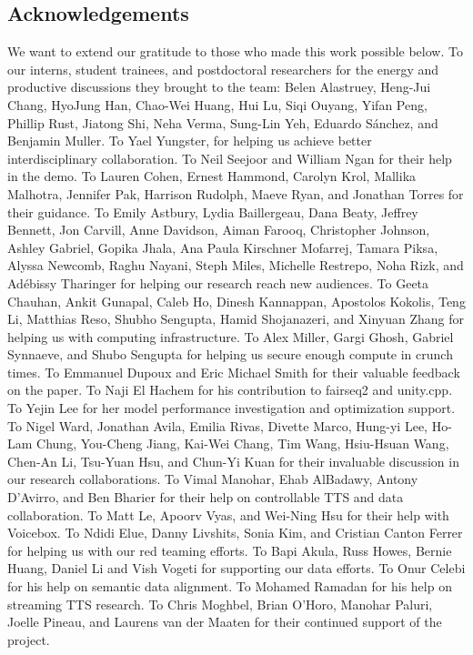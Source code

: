 \subsection*{Acknowledgements}
We want to extend our gratitude to those who made this work possible below. To our interns, student trainees, and postdoctoral researchers for the energy and productive discussions they brought to the team: Belen Alastruey, Heng-Jui Chang, HyoJung Han, Chao-Wei Huang, Hui Lu, Siqi Ouyang, Yifan Peng, Phillip Rust, Jiatong Shi, Neha Verma, Sung-Lin Yeh, Eduardo Sánchez, and Benjamin Muller. To Yael Yungster, for helping us achieve better interdisciplinary collaboration. To Neil Seejoor and William Ngan for their help in the demo. To Lauren Cohen, Ernest Hammond, Carolyn Krol, Mallika Malhotra, Jennifer Pak, Harrison Rudolph, Maeve Ryan, and Jonathan Torres for their guidance. To Emily Astbury, Lydia Baillergeau, Dana Beaty, Jeffrey Bennett, Jon Carvill, Anne Davidson, Aiman Farooq, Christopher Johnson, Ashley Gabriel, Gopika Jhala, Ana Paula Kirschner Mofarrej, Tamara Piksa, Alyssa Newcomb, Raghu Nayani, Steph Miles, Michelle Restrepo, Noha Rizk, and Adébissy Tharinger for helping our research reach new audiences. To Geeta Chauhan, Ankit Gunapal, Caleb Ho, Dinesh Kannappan, Apostolos Kokolis, Teng Li, Matthias Reso, Shubho Sengupta, Hamid Shojanazeri, and Xinyuan Zhang for helping us with computing infrastructure. To Alex Miller, Gargi Ghosh, Gabriel Synnaeve, and Shubo Sengupta for helping us secure enough compute in crunch times. To Emmanuel Dupoux and Eric Michael Smith for their valuable feedback on the paper. To Naji El Hachem for his contribution to fairseq2 and unity.cpp. To Yejin Lee for her model performance investigation and optimization support. To Nigel Ward, Jonathan Avila, Emilia Rivas, Divette Marco, Hung-yi Lee, Ho-Lam Chung, You-Cheng Jiang, Kai-Wei Chang, Tim Wang, Hsiu-Hsuan Wang, Chen-An Li, Tsu-Yuan Hsu, and Chun-Yi Kuan for their invaluable discussion in our research collaborations. To Vimal Manohar, Ehab AlBadawy, Antony D'Avirro, and Ben Bharier for their help on controllable TTS and data collaboration. To Matt Le, Apoorv Vyas, and Wei-Ning Hsu for their help with Voicebox. To Ndidi Elue, Danny Livshits, Sonia Kim, and Cristian Canton Ferrer for helping us with our red teaming efforts. To Bapi Akula, Russ Howes, Bernie Huang, Daniel Li and Vish Vogeti for supporting our data efforts. To Onur Celebi for his help on semantic data alignment. To Mohamed Ramadan for his help on streaming TTS research. To Chris Moghbel,  Brian O'Horo, Manohar Paluri, Joelle Pineau, and Laurens van der Maaten for their continued support of the project.
